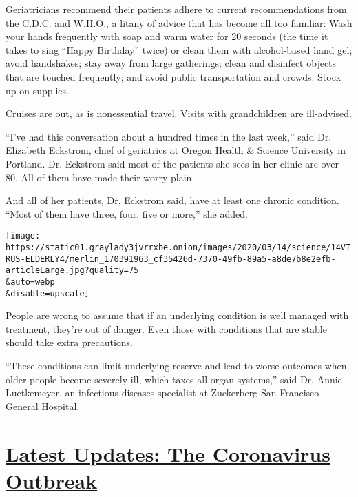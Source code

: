 Geriatricians recommend their patients adhere to current recommendations
from the
\href{https://www.cdc.gov/coronavirus/2019-ncov/specific-groups/high-risk-complications.html\#who-is-higher-risk}{C.D.C}.
and W.H.O., a litany of advice that has become all too familiar: Wash
your hands frequently with soap and warm water for 20 seconds (the time
it takes to sing ``Happy Birthday'' twice) or clean them with
alcohol-based hand gel; avoid handshakes; stay away from large
gatherings; clean and disinfect objects that are touched frequently; and
avoid public transportation and crowds. Stock up on supplies.

Cruises are out, as is nonessential travel. Visits with grandchildren
are ill-advised.

``I've had this conversation about a hundred times in the last week,''
said Dr. Elizabeth Eckstrom, chief of geriatrics at Oregon Health \&
Science University in Portland. Dr. Eckstrom said most of the patients
she sees in her clinic are over 80. All of them have made their worry
plain.

And all of her patients, Dr. Eckstrom said, have at least one chronic
condition. ``Most of them have three, four, five or more,'' she added.

\texttt{[image: https://static01.graylady3jvrrxbe.onion/images/2020/03/14/science/14VIRUS-ELDERLY4/merlin\_170391963\_cf35426d-7370-49fb-89a5-a8de7b8e2efb-articleLarge.jpg?quality=75\\\&auto=webp\\\&disable=upscale]}

People are wrong to assume that if an underlying condition is well
managed with treatment, they're out of danger. Even those with
conditions that are stable should take extra precautions.

``These conditions can limit underlying reserve and lead to worse
outcomes when older people become severely ill, which taxes all organ
systems,'' said Dr. Annie Luetkemeyer, an infectious diseases specialist
at Zuckerberg San Francisco General Hospital.

\hypertarget{latest-updates-the-coronavirus-outbreak}{%
\section{\texorpdfstring{\href{https://www.nytimes3xbfgragh.onion/2020/08/21/world/covid-19-coronavirus.html?action=click\&pgtype=Article\&state=default\&region=MAIN_CONTENT_1\&context=storylines_live_updates}{Latest
Updates: The Coronavirus
Outbreak}}{Latest Updates: The Coronavirus Outbreak}}\label{latest-updates-the-coronavirus-outbreak}}

